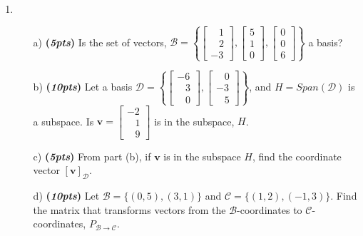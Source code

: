 \documentclass[12pt]{article}%
\begin{document}
\begin{enumerate}
    \item 
    \begin{itemize}
        \item[a)]\textbf{(\emph{5pts})} 
            Is the set of vectors, 
            \(
            \mathcal{B} = \left\{
            \begin{bmatrix} \;\;\;1\\\;\;\;2\\-3 \end{bmatrix},
            \begin{bmatrix} 5\\1\\0 \end{bmatrix},
            \begin{bmatrix} 0\\0\\6 \end{bmatrix}
            \right\}
            \)
            a basis?

        \vspace{9cm}
        
        \item[b)]\textbf{(\emph{10pts})} 
            Let a basis \(\mathcal{D}=\left\{\begin{bmatrix} -6\\\;\;\;3\\ \;\;\;0\end{bmatrix},
            \begin{bmatrix} \;\;\;0\\ -3\\ \;\;\;5\end{bmatrix}\right\}\), and 
            \(H=Span(\mathcal{D})\) is a subspace.
            Is \(\mathbf{v}=\begin{bmatrix} -2\\\;\;\;1\\\;\;\;9\end{bmatrix}\) is in the subspace, \(H\).

        \vspace{7cm}
        
        \item[c)]\textbf{(\emph{5pts})}  From part (b), if \(\mathbf{v}\) is in the subspace \(H\), find the coordinate vector \([\mathbf{v}]_{\mathcal{D}}\).

        \newpage

        \item[d)]\textbf{(\emph{10pts})} Let \( {\mathcal{B}} = \{ (0,5), (3,1) \} \) and \( {\mathcal{C}} = \{ (1,2), (-1,3) \} \).
        Find the matrix that transforms vectors from the \(\mathcal{B}\)-coordinates to  \(\mathcal{C}\)-coordinates, \( P_{{\mathcal{B}} \to {\mathcal{C}}} \).


\end{itemize}
\end{enumerate}
\end{document}
